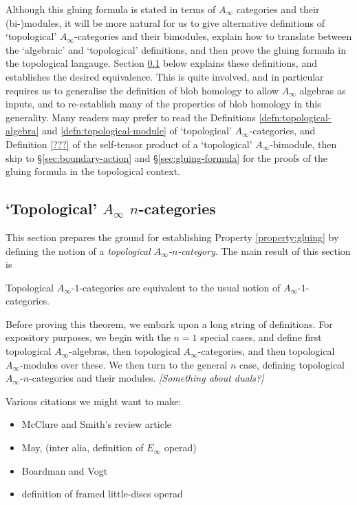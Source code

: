 \documentclass[11pt,leqno]{amsart}
\def\nn#1{{{\it \small [#1]}}}
\begin{document}
Although this gluing formula is stated in terms of $A_\infty$ categories and their (bi-)modules, it will be more natural for us to give alternative
definitions of `topological' $A_\infty$-categories and their bimodules, explain how to translate between the `algebraic' and `topological' definitions,
and then prove the gluing formula in the topological langauge. Section \ref{sec:topological-A-infty} below explains these definitions, and establishes
the desired equivalence. This is quite involved, and in particular requires us to generalise the definition of blob homology to allow $A_\infty$ algebras
as inputs, and to re-establish many of the properties of blob homology in this generality. Many readers may prefer to read the
Definitions \ref{defn:topological-algebra} and \ref{defn:topological-module} of `topological' $A_\infty$-categories, and Definition \ref{???} of the
self-tensor product of a `topological' $A_\infty$-bimodule, then skip to \S \ref{sec:boundary-action} and \S \ref{sec:gluing-formula} for the proofs
of the gluing formula in the topological context.

\subsection{`Topological' $A_\infty$ $n$-categories}
\label{sec:topological-A-infty}%

This section prepares the ground for establishing Property \ref{property:gluing} by defining the notion of a \emph{topological $A_\infty$-$n$-category}.
The main result of this section is

\begin{thm}
Topological $A_\infty$-$1$-categories are equivalent to the usual notion of
$A_\infty$-$1$-categories.
\end{thm}

Before proving this theorem, we embark upon a long string of definitions.
For expository purposes, we begin with the $n=1$ special cases, and define
first topological $A_\infty$-algebras, then topological $A_\infty$-categories, and then topological $A_\infty$-modules over these. We then turn
to the general $n$ case, defining topological $A_\infty$-$n$-categories and their modules.
\nn{Something about duals?}

\todo{}
Various citations we might want to make:
\begin{itemize}
\item \cite{MR2061854} McClure and Smith's review article
\item \cite{MR0420610} May, (inter alia, definition of $E_\infty$ operad)
\item \cite{MR0236922,MR0420609} Boardman and Vogt
\item \cite{MR1256989} definition of framed little-discs operad
\end{itemize}
\end{document}
